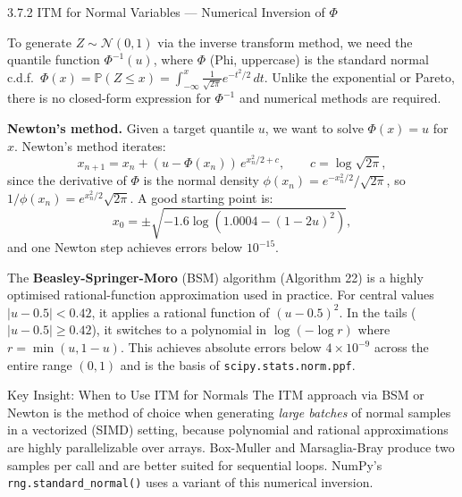 \documentclass[aspectratio=169,10pt]{beamer}
\newcommand{\PP}{\mathbb{P}}
\newcommand{\NN}{\mathcal{N}}
\begin{document}
\begin{frame}[allowframebreaks]{3.7.2 ITM for Normal Variables --- Numerical Inversion of $\Phi$}

To generate $Z \sim \NN(0,1)$ via the inverse transform method, we need the
quantile function $\Phi^{-1}(u)$, where $\Phi$ (Phi, uppercase) is the
standard normal c.d.f.\ $\Phi(x) = \PP(Z \le x) = \int_{-\infty}^x \frac{1}{\sqrt{2\pi}}e^{-t^2/2}\,dt$.
Unlike the exponential or Pareto, there is no closed-form expression for
$\Phi^{-1}$ and numerical methods are required.

\textbf{Newton's method.}  Given a target quantile $u$, we want to solve
$\Phi(x) = u$ for $x$.  Newton's method iterates:
\[
  x_{n+1} = x_n + (u - \Phi(x_n))\,e^{x_n^2/2 + c}, \qquad
  c = \log\!\sqrt{2\pi},
\]
since the derivative of $\Phi$ is the normal density $\phi(x_n) = e^{-x_n^2/2}/\sqrt{2\pi}$,
so $1/\phi(x_n) = e^{x_n^2/2}\sqrt{2\pi}$.  A good starting point is:
\[
  x_0 = \pm\sqrt{-1.6\log(1.0004 - (1 - 2u)^2)},
\]
and one Newton step achieves errors below $10^{-15}$.

The \textbf{Beasley-Springer-Moro} (BSM) algorithm (Algorithm 22) is a highly
optimised rational-function approximation used in practice.  For central values
$|u - 0.5| < 0.42$, it applies a rational function of $(u - 0.5)^2$.  In the
tails ($|u - 0.5| \ge 0.42$), it switches to a polynomial in $\log(-\log r)$
where $r = \min(u, 1-u)$.  This achieves absolute errors below $4 \times 10^{-9}$
across the entire range $(0,1)$ and is the basis of \texttt{scipy.stats.norm.ppf}.

\begin{alertblock}{Key Insight: When to Use ITM for Normals}
  The ITM approach via BSM or Newton is the method of choice when generating
  \emph{large batches} of normal samples in a vectorized (SIMD) setting,
  because polynomial and rational approximations are highly parallelizable
  over arrays.  Box-Muller and Marsaglia-Bray produce two samples per
  call and are better suited for sequential loops.  NumPy's
  \texttt{rng.standard\_normal()} uses a variant of this numerical inversion.
\end{alertblock}

\end{frame}
\end{document}
